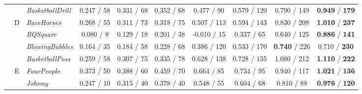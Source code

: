 \documentclass[nohyperref]{article}
\theoremstyle{plain}
\theoremstyle{definition}
\theoremstyle{remark}
\begin{document}
\begin{table*}[t]
{\begin{threeparttable}
\begin{tabular}{|c|c|l|c c| c c| c c| c c| c c|c c|c c|}
			& & \textit{BasketballDrill}
			& \multicolumn{2}{c|}{0.247 / 58} & \multicolumn{2}{c|}{0.331 / 68}  & \multicolumn{2}{c|}{0.352 / 68} & \multicolumn{2}{c|}{0.477 / 90} &\multicolumn{2}{c|}{0.579 / 120} &\multicolumn{2}{c|}{0.790 / 149} & \multicolumn{2}{c|}{\textbf{0.949} / \textbf{179}}\\
			
			\cline{2-17}
			& \multirow{4}{*}{D} & \textit{RaceHorses}
			& \multicolumn{2}{c|}{0.268 / 55} & \multicolumn{2}{c|}{0.311 / 73}  & \multicolumn{2}{c|}{0.318 / 75} & \multicolumn{2}{c|}{0.507 / 113} & \multicolumn{2}{c|}{0.594 / 143} & \multicolumn{2}{c|}{0.830 / 208} & \multicolumn{2}{c|}{\textbf{1.010} / \textbf{237}}\\
			
			& & \textit{BQSquare}
			& \multicolumn{2}{c|}{0.080 / 8} & \multicolumn{2}{c|}{0.129 / 18}  & \multicolumn{2}{c|}{0.201 / 38} & \multicolumn{2}{c|}{-0.010 / 15} & \multicolumn{2}{c|}{0.337 / 65} & \multicolumn{2}{c|}{0.640 / 125} & \multicolumn{2}{c|}{\textbf{0.886} / \textbf{141}}\\
			
			& & \textit{BlowingBubbles}
			& \multicolumn{2}{c|}{0.164 / 35} & \multicolumn{2}{c|}{0.184 / 58}  & \multicolumn{2}{c|}{0.228 / 68} & \multicolumn{2}{c|}{0.386 / 120} & \multicolumn{2}{c|}{0.533 / 170} & \multicolumn{2}{c|}{\textbf{0.740} / 226} & \multicolumn{2}{c|}{0.710 / \textbf{230}}\\
			
			& & \textit{BasketballPass}
			& \multicolumn{2}{c|}{0.259 / 58} & \multicolumn{2}{c|}{0.307 / 75}  & \multicolumn{2}{c|}{0.335 / 78} & \multicolumn{2}{c|}{0.628 / 138} & \multicolumn{2}{c|}{0.728 / 155} & \multicolumn{2}{c|}{1.080 / 212} & \multicolumn{2}{c|}{\textbf{1.110} / \textbf{222}}\\
			
			\cline{2-17}
			& \multirow{3}{*}{E} & \textit{FourPeople}
			& \multicolumn{2}{c|}{0.373 / 50} & \multicolumn{2}{c|}{0.388 / 60}  & \multicolumn{2}{c|}{0.459 / 70} & \multicolumn{2}{c|}{0.664 / 85} & \multicolumn{2}{c|}{0.734 / 95} & \multicolumn{2}{c|}{0.940 / 117} & \multicolumn{2}{c|}{\textbf{1.021} / \textbf{136}}\\
			
			& & \textit{Johnny}
			& \multicolumn{2}{c|}{0.247 / 10} & \multicolumn{2}{c|}{0.315 / 40}  & \multicolumn{2}{c|}{0.378 / 40} & \multicolumn{2}{c|}{0.548 / 55} & \multicolumn{2}{c|}{0.604 / 68} & \multicolumn{2}{c|}{0.810 / 88} & \multicolumn{2}{c|}{\textbf{0.976} / \textbf{120}}\\
			

\end{tabular}
\end{threeparttable}}
\end{table*}
\end{document}
